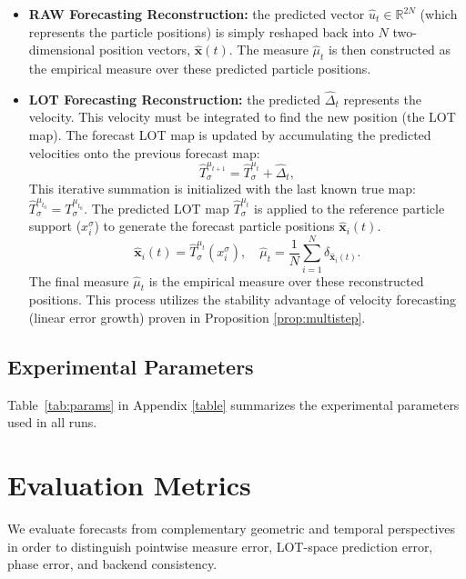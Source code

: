 \documentclass[11pt]{article}
\newcommand{\1}{\mathbf{1}}
\begin{document}
\begin{itemize}
\item \textbf{RAW Forecasting Reconstruction:} the predicted vector $\widehat{u}_t \in \mathbb{R}^{2N}$ (which represents the particle positions) is simply reshaped back into $N$ two-dimensional position vectors, $\widehat{\mathbf{x}}(t)$. The measure $\widehat{\mu}_t$ is then constructed as the empirical measure over these predicted particle positions.

\item \textbf{LOT Forecasting Reconstruction:} the predicted $\widehat{\Delta}_t$ represents the velocity. This velocity must be integrated to find the new position (the LOT map). The forecast LOT map is updated by accumulating the predicted velocities onto the previous forecast map:
\begin{equation}\label{eq:map-recon}
\widehat{T}_\sigma^{\mu_{t+1}} 
= \widehat{T}_\sigma^{\mu_t} + \widehat{\Delta}_t,
\end{equation}
This iterative summation is initialized with the last known true map: $\widehat{T}_\sigma^{\mu_{t_0}} = T_\sigma^{\mu_{t_0}}$. The predicted LOT map $\widehat{T}_\sigma^{\mu_t}$ is applied to the reference particle support ($x_i^\sigma$) to generate the forecast particle positions $\widehat{\mathbf{x}}_i(t)$.
\[
\widehat{\mathbf{x}}_i(t) = \widehat{T}_\sigma^{\mu_t}(x_i^\sigma),
\quad
\widehat{\mu}_t = \frac{1}{N} \sum_{i=1}^N \delta_{\widehat{\mathbf{x}}_i(t)}.
\]
The final measure $\widehat{\mu}_t$ is the empirical measure over these reconstructed positions. This process utilizes the stability advantage of velocity forecasting (linear error growth) proven in Proposition \ref{prop:multistep}.
\end{itemize}

\subsection{Experimental Parameters}\label{sec:exp-params}

Table~\ref{tab:params} in Appendix \ref{table} summarizes the experimental parameters used in all runs.

\section{Evaluation Metrics}\label{sec:metrics}

We evaluate forecasts from complementary geometric and temporal perspectives in order to distinguish pointwise measure error, LOT-space prediction error, phase error, and backend consistency.
\end{document}
